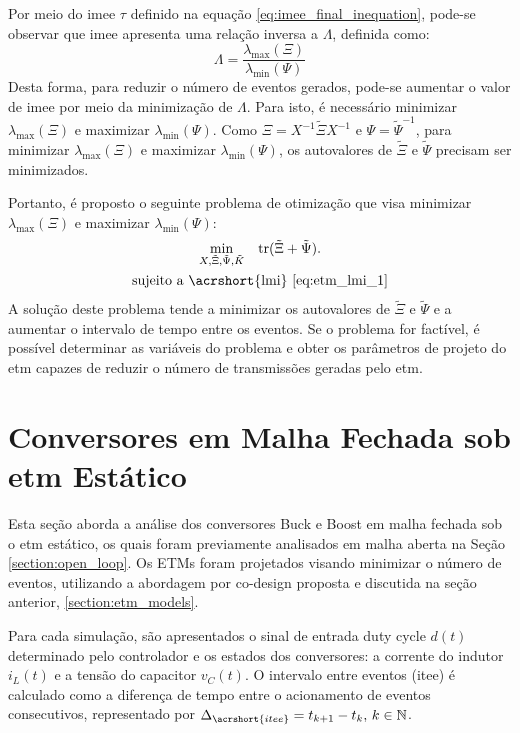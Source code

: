 Por meio do \acrshort{imee} $\tau$ definido na equação \eqref{eq:imee_final_inequation}, pode-se observar que \acrshort{imee} apresenta uma relação inversa a $\Lambda$, definida como: \begin{equation}
  \Lambda = \frac{\lambda_{\max}(\Xi)}{\lambda_{\min}(\Psi)}
\end{equation} Desta forma, para reduzir o número de eventos gerados, pode-se aumentar o valor de \acrshort{imee} por meio da minimização de $\Lambda$. Para isto, é necessário minimizar $\lambda_{\max} (\Xi)$ e maximizar $\lambda_{\min}(\Psi)$. Como $\Xi = X^{-1}\tilde{\Xi}X^{-1}$ e $\Psi = \tilde{\Psi}^{-1}$, para minimizar $\lambda_{\max} (\Xi)$ e maximizar $\lambda_{\min}(\Psi)$, os autovalores de $\tilde{\Xi}$ e $\tilde{\Psi}$ precisam ser minimizados.

Portanto, é proposto o seguinte problema de otimização que visa minimizar $\lambda_{\max} (\Xi)$ e maximizar $\lambda_{\min}(\Psi)$: \begin{gather}\underset{X, \tilde{\Xi}, \tilde{\Psi}, \tilde{K}}\min \quad \mathrm{tr}(\tilde{\Xi} + \tilde{\Psi}). \\ \textrm{sujeito a \acrshort{lmi} } \eqref{eq:etm_lmi_1} \label{eq:optimization_problem}\end{gather} A solução deste problema tende a minimizar os autovalores de $\tilde{\Xi}$ e $\tilde{\Psi}$ e a aumentar o intervalo de tempo entre os eventos. Se o problema for factível, é possível determinar as variáveis do problema e obter os parâmetros de projeto do \acrshort{etm} capazes de reduzir o número de transmissões geradas pelo \acrshort{etm}.

\section{Conversores em Malha Fechada sob \acrshort{etm} Estático}

Esta seção aborda a análise dos conversores Buck e Boost em malha fechada sob o \acrshort{etm} estático, os quais foram previamente analisados em malha aberta na Seção \ref{section:open_loop}. Os ETMs foram projetados visando minimizar o número de eventos, utilizando a abordagem por co-design proposta e discutida na seção anterior, \autoref{section:etm_models}.

Para cada simulação, são apresentados o sinal de entrada duty cycle $d(t)$ determinado pelo controlador  e os estados dos conversores: a corrente do indutor $i_L(t)$ e a tensão do capacitor $v_C(t)$. O intervalo entre eventos (\acrshort{itee}) é calculado como a diferença de tempo entre o acionamento de eventos consecutivos, representado por $\Delta_{\acrshort{itee}} = t_{k + 1} - t_k, \, k \in \mathbb{N}$.

